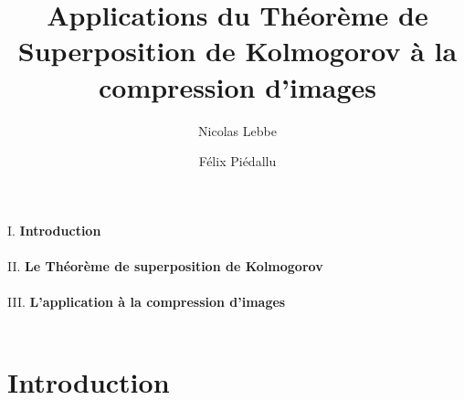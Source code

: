 \documentclass[8pt,a9paper]{beamer} \usepackage[utf8]{inputenc} \usepackage[francais]{babel} \usepackage[T1]{fontenc}
\title{Applications du Théorème de Superposition de Kolmogorov à la compression d'images} \date{}
\author{Nicolas Lebbe}
\author{Félix Piédallu}
\begin{document}
\begin{frame}
	\maketitle
	\hspace{3cm}I. \textbf{{\large Introduction}}\textbf{\\}\textbf{\\}
	\hspace{2.9075cm}II. \textbf{{\large Le Théorème de superposition de Kolmogorov}}\textbf{\\}\textbf{\\}
	\hspace{2.815cm}III. \textbf{{\large L'application à la compression d'images}}\textbf{\\}\textbf{\\}
\end{frame}
\section{Introduction}
\end{document}
